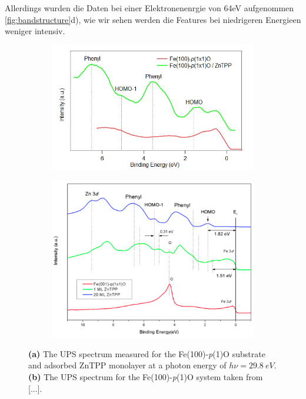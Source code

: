 Allerdings wurden die Daten bei einer Elektronenenrgie von 64eV aufgenommen \autoref{fig:bandstructure}d), wie wir sehen werden die Features bei niedrigeren Energieen weniger intensiv.

\begin{figure}[h]
    \centering
    \begin{subfigure}{0.49\textwidth}
        \centering
        \includegraphics[width = \textwidth]{Plots/integrated_spectrum_Fe.png}
        \caption{}
        \label{fig:ups_spectrum}
    \end{subfigure}
    \hfill
    \begin{subfigure}{0.49\textwidth}
        \centering
        \includegraphics[width = \textwidth]{Plots/integrated_spectrum_Fe_lit.png}
        \caption{}
        \label{fig:ups_spectrum_lit}
    \end{subfigure}
    \caption{\textbf{(a)} The UPS spectrum measured for the Fe(100)-\textit{p}(1)O substrate and adsorbed ZnTPP monolayer at a photon energy of $h\nu = \qty{29.8}{eV}$. \textbf{(b)} The UPS spectrum for the Fe(100)-\textit{p}(1)O system taken from [...].}
    \label{fig:ups}
\end{figure}
